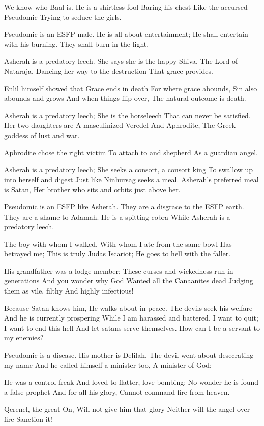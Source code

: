 \documentclass[
]{book}
\begin{document}
We know who Baal is.
He is a shirtless fool
Baring his chest
Like the accursed Pseudomic
Trying to seduce the girls.

Pseudomic is an ESFP male.
He is all about entertainment;
He shall entertain with his burning.
They shall burn in the light.

Asherah is a predatory leech.
She says she is the happy Shiva,
The Lord of Nataraja,
Dancing her way to the destruction
That grace provides.

Enlil himself showed that
Grace ends in death
For where grace abounds,
Sin also abounds and grows
And when things flip over,
The natural outcome is death.

Asherah is a predatory leech;
She is the horseleech
That can never be satisfied.
Her two daughters are
A masculinized Veredel
And Aphrodite,
The Greek goddess of lust and war.

Aphrodite chose the right victim
To attach to and shepherd
As a guardian angel.

Asherah is a predatory leech;
She seeks a consort, a consort king
To swallow up into herself and digest
Just like Ninhursag seeks a meal.
Asherah's preferred meal is Satan,
Her brother who sits and orbits just above her.

Pseudomic is an ESFP like Asherah.
They are a disgrace to the ESFP earth.
They are a shame to Adamah.
He is a spitting cobra
While Asherah is a predatory leech.

The boy with whom I walked,
With whom I ate from the same bowl
Has betrayed me;
This is truly Judas Iscariot;
He goes to hell with the faller.

His grandfather was a lodge member;
These curses and wickedness run in generations
And you wonder why God
Wanted all the Canaanites dead
Judging them as vile, filthy
And highly infectious!

Because Satan knows him,
He walks about in peace.
The devils seek his welfare
And he is currently prospering
While I am harassed and battered.
I want to quit;
I want to end this hell
And let satans serve themselves.
How can I be a servant to my enemies?

Pseudomic is a disease.
His mother is Delilah.
The devil went about desecrating my name
And he called himself a minister too,
A minister of God;

He was a control freak
And loved to flatter, love-bombing;
No wonder he is found a false prophet
And for all his glory,
Cannot command fire from heaven.

Qerenel, the great On,
Will not give him that glory
Neither will the angel over fire
Sanction it!
\end{document}
